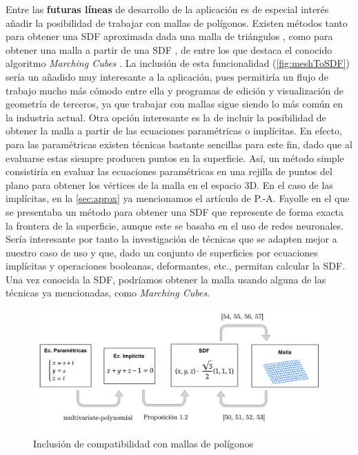 Entre las \textbf{futuras líneas} de desarrollo de la aplicación es de especial interés añadir la posibilidad de trabajar con mallas de polígonos. Existen métodos tanto para obtener una SDF aproximada dada una malla de triángulos \cite{meshToSDF2, meshToSDF3, meshToSDF4, meshToSDF5}, como para obtener una malla a partir de una SDF \cite{sdfToMesh, sdfToMesh2, sdfToMesh3, sdfToMesh4}, de entre los que destaca el conocido algoritmo \textit{Marching Cubes} \cite{marchingcubes}. La inclusión de esta funcionalidad (\autoref{fig:meshToSDF}) sería un añadido muy interesante a la aplicación, pues permitiría un flujo de trabajo mucho más cómodo entre ella y programas de edición y visualización de geometría de terceros, ya que trabajar con mallas sigue siendo lo más común en la industria actual. Otra opción interesante es la de incluir la posibilidad de obtener la malla a partir de las ecuaciones paramétricas o implícitas. En efecto, para las paramétricas existen técnicas bastante sencillas para este fin, dado que al evaluarse estas siempre producen puntos en la superficie. Así, un método simple consistiría en evaluar las ecuaciones paramétricas en una rejilla de puntos del plano para obtener los vértices de la malla en el espacio 3D. En el caso de las implícitas, en la \autoref{sec:aprox} ya mencionamos el artículo de P.-A. Fayolle \cite{article:aprox} en el que se presentaba un método para obtener una SDF que represente de forma exacta la frontera de la superficie, aunque este se basaba en el uso de redes neuronales. Sería interesante por tanto la investigación de técnicas que se adapten mejor a nuestro caso de uso y que, dado un conjunto de superficies por ecuaciones implícitas y operaciones booleanas, deformantes, etc., permitan calcular la SDF. Una vez conocida la SDF, podríamos obtener la malla usando alguna de las técnicas ya mencionadas, como \textit{Marching Cubes}.\newline
\begin{figure}[!ht]
    \centering
    \includegraphics[width=\textwidth]{Plantilla-TFG-master/img/meshToSDF.png}
    \caption{Inclusión de compatibilidad con mallas de polígonos}
    \label{fig:meshToSDF}
\end{figure}

